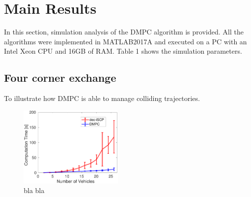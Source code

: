 \section{Main Results}
\label{sec:results}

In this section, simulation analysis of the DMPC algorithm is provided. All the algorithms were implemented in MATLAB2017A and executed on a PC with an Intel Xeon CPU and 16GB of RAM. Table 1 shows the simulation parameters.

\subsection{Four corner exchange}
To illustrate how DMPC is able to manage colliding trajectories.

\begin{figure}[t]
	\centering
	\includegraphics[width=0.45\textwidth]{figures/comp_time}
	\caption{bla bla}
	\label{fig:comp_time}
\end{figure}